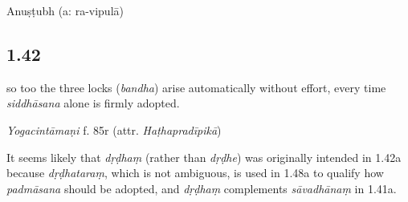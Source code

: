 \begin{ekdosis}
\begin{testimonia}[hp01_041]
\begin{versinnote}
\end{versinnote}

\end{testimonia}


\begin{metre}[hp01_041]
Anuṣṭubh (a: ra-vipulā)
\end{metre}

\subsection*{1.42}
\begin{translation}[hp01_042]
[...] so too the three locks (\emph{bandha}) arise automatically without effort, every time \emph{siddhāsana} alone is firmly adopted.
\end{translation}


\begin{testimonia}[hp01_042]
\emph{Yogacintāmaṇi} f. 85r (attr. \emph{Haṭhapradīpikā})

\begin{versinnote}
\end{versinnote}


\end{testimonia}

\begin{philcomm}[hp01_042]
It seems likely that \emph{dṛḍhaṃ} (rather than \emph{dṛḍhe}) was originally intended in 1.42a because \emph{dṛḍhataraṃ}, which is not ambiguous, is used in 1.48a to qualify how \emph{padmāsana} should be adopted, and \emph{dṛḍhaṃ} complements \emph{sāvadhānaṃ} in 1.41a.
\end{philcomm}


\end{ekdosis}
